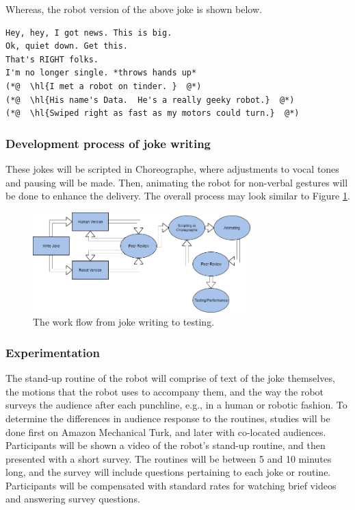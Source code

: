 Whereas, the robot version of the above joke is shown below.

\begin{lstlisting}
Hey, hey, I got news. This is big.
Ok, quiet down. Get this.
That's RIGHT folks.
I'm no longer single. *throws hands up*
(*@  \hl{I met a robot on tinder. }  @*)
(*@  \hl{His name's Data.  He's a really geeky robot.}  @*)
(*@  \hl{Swiped right as fast as my motors could turn.}  @*)
\end{lstlisting}

\subsubsection{Development process of joke writing}
These jokes will be scripted in Choreographe, where adjustments to vocal tones and pausing will be made.
Then, animating the robot for non-verbal gestures will be done to enhance the delivery.
The overall process may look similar to Figure \ref{fig:write_process}.

\begin{figure}[H]
  \centering
  \includegraphics[width=0.75\textwidth,height=0.75\textheight,keepaspectratio]{joke_writing_process}
  \caption{The work flow from joke writing to testing.}
	\label{fig:write_process}
\end{figure}

\subsubsection{Experimentation}
The stand-up routine of the robot will comprise of text of the joke themselves, the motions that the robot uses to
accompany them, and the way the robot surveys the audience after each punchline, e.g., in a human or robotic fashion.
To determine the differences in audience response to the routines, studies will be done first on Amazon Mechanical
Turk, and later with co-located audiences. Participants will be shown a video of the robot’s stand-up routine, and then
presented with a short survey. The routines will be between 5 and 10 minutes long, and the survey will include questions
pertaining to each joke or routine. Participants will be compensated with standard rates for watching brief videos and
answering survey questions.

